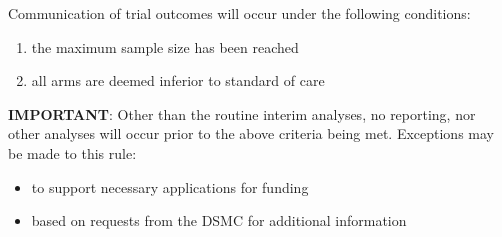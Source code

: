 \documentclass[
]{article}
\providecommand{\tightlist}{%
  \setlength{\itemsep}{0pt}\setlength{\parskip}{0pt}}
\begin{document}
Communication of trial outcomes will occur under the following conditions:

\begin{enumerate}
  \def\labelenumi{\arabic{enumi}.}
  \tightlist
  \item
        the maximum sample size has been reached
  \item
        all arms are deemed inferior to standard of care
\end{enumerate}

\textbf{IMPORTANT}: Other than the routine interim analyses, no reporting, nor other analyses will occur prior to the above criteria being met.
Exceptions may be made to this rule:

\begin{itemize}
  \item to support necessary applications for funding
  \item based on requests from the DSMC for additional information
\end{itemize}

\clearpage

\printbibliography[heading=bibintoc]
\end{document}
